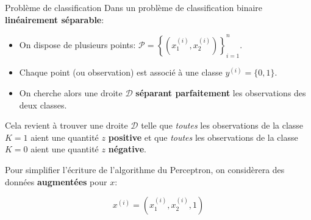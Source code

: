 \begin{frame}{Problème de classification}
	Dans un problème de classification binaire \textbf{linéairement séparable}:
	
	\begin{itemize}
		\item On dispose de plusieurs points: $\mathcal{P} = \left\{ \left( x_1^{(i)}, x_2^{(i)}\right) \right\}_{i=1}^n$.
		\item Chaque point (ou observation) est associé à une classe $y^{(i)} = \{0, 1\}$.
		\item On cherche alors une droite $\mathcal{D}$ \textbf{séparant parfaitement} les observations des deux classes.
	\end{itemize}
	
	\vspace{0.3cm}
	\pause
	
	Cela revient à trouver une droite $\mathcal{D}$ telle que \textit{toutes} les observations de la classe $K = 1$ aient une quantité $z$ \textbf{positive} et que \textit{toutes} les observations de la classe $K = 0$ aient une quantité $z$ \textbf{négative}.
	
	\vspace{0.3cm}
	\pause
	
	Pour simplifier l'écriture de l'algorithme du Perceptron, on considèrera des données \textbf{augmentées} pour $x$:
	
	\begin{equation*}
		x^{(i)} = \left( x_1^{(i)}, x_2^{(i)}, 1\right)
	\end{equation*}
\end{frame}

